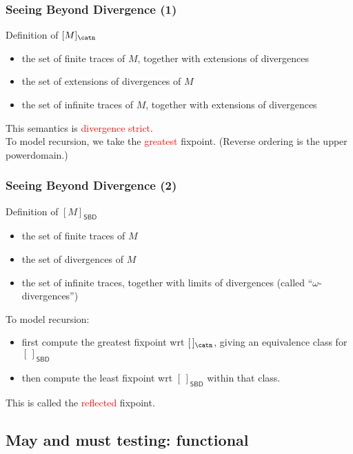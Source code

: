 \documentclass{beamer}
\newcommand{\SBD}{\mathsf{SBD}}
\newcommand{\red}[1]{\textcolor{red}{#1}}
\begin{document}
\begin{frame}\frametitle{Seeing Beyond Divergence (1)}


  \begin{block}{Definition of $[M]_{\catn}$}
\begin{itemize}
\item the set of finite traces of $M$, together with extensions of divergences
\item the set of extensions of divergences of $M$
\item the set of infinite traces of $M$, together with extensions of divergences
\end{itemize}
\end{block}
This semantics is \red{divergence strict}. \\
\medskip \pause
To model recursion, we take the \red{greatest} fixpoint.  (Reverse ordering is the upper powerdomain.)




\end{frame}

\begin{frame}\frametitle{Seeing Beyond Divergence (2)}


  \begin{block}{Definition of $[M]_{\SBD}$} 
\begin{itemize}
\item the set of finite traces of $M$
\item the set of divergences of $M$
\item the set of infinite traces, together with limits of divergences (called
  ``$\omega$-divergences'')
\end{itemize}
\end{block}
\medskip \pause
To model recursion:
\begin{itemize}
\item first compute the greatest fixpoint wrt $[\,]_{\catn}$, giving an equivalence class for $[\,]_{\SBD}$
\item then compute the least fixpoint wrt $[\,]_{\SBD}$ within that class.
\end{itemize}
This is called the \red{reflected} fixpoint.
  
\end{frame}

\subsection{May and must testing: functional}
\end{document}
